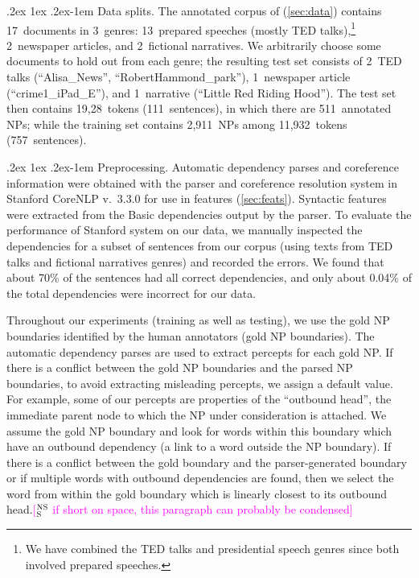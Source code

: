 \documentclass[11pt,letterpaper]{article}
\makeatletter
\newcommand{\ensuretext}[1]{#1}
\newcommand{\nssmarker}{\ensuretext{\textcolor{magenta}{\ensuremath{^{\textsc{NS}}_{\textsc{S}}}}}}
\newcommand{\arkcomment}[3]{\ensuretext{\textcolor{#3}{[#1 #2]}}}
\newcommand{\nss}[1]{\arkcomment{\nssmarker}{#1}{magenta}}
\renewcommand{\paragraph}{%
  \@startsection{paragraph}{4}%
  {\z@}{.2ex \@plus 1ex \@minus .2ex}{-1em}%
  {\normalfont\normalsize\bfseries}%
}
\makeatother
\begin{document}
\paragraph{Data splits.} The annotated corpus of \citet{bhatia14} (\cref{sec:data}) contains 17~documents 
in 3~genres: 13~prepared speeches (mostly TED talks),\footnote{We have combined the TED talks and presidential speech genres since both involved prepared speeches.} 2~newspaper articles, 
and 2~fictional narratives. We arbitrarily choose some documents to hold out from each genre; 
the resulting test set consists of 2~TED talks (``Alisa\_News'', ``RobertHammond\_park''), 
1~newspaper article (``crime1\_iPad\_E''), and 1~narrative (``Little Red Riding Hood'').
The test set then contains 19,28~tokens (111~sentences), in which there are 511~annotated NPs; 
while the training set contains 2,911~NPs among 11,932~tokens (757~sentences).

\paragraph{Preprocessing.} Automatic dependency parses and coreference information were obtained with 
the parser and coreference resolution system in Stanford CoreNLP v.~3.3.0 \citep{socher-13,recasens-13}
for use in features (\cref{sec:feats}). Syntactic features were extracted from the Basic dependencies output by the parser. 
To evaluate the performance of Stanford system on our data, 
we manually inspected the dependencies for a subset of sentences from our corpus (using texts from TED talks and fictional narratives genres) 
and recorded the errors. 
We found that about 70\% of the sentences had all correct dependencies, and only about 0.04\% of the total dependencies were incorrect for our data.

Throughout our experiments (training as well as testing), we use the gold NP boundaries identified by the human annotators (gold NP boundaries).
The automatic dependency parses are used to extract percepts for each gold NP.     
If there is a conflict between the gold NP boundaries and the parsed NP boundaries, to avoid extracting misleading percepts, 
we assign a default value.  
For example, some of our percepts are properties of the ``outbound head'', the immediate parent node to which the NP under consideration is attached.
We assume the gold NP boundary and look for words within this boundary which have an outbound dependency (a link to a word outside the NP boundary).    
If there is a conflict between the gold boundary  and the parser-generated boundary or if multiple words with outbound dependencies are found, then
we select the word from within the gold boundary which is linearly closest to its outbound head.\nss{if short on space, this paragraph can probably be condensed}
\end{document}
